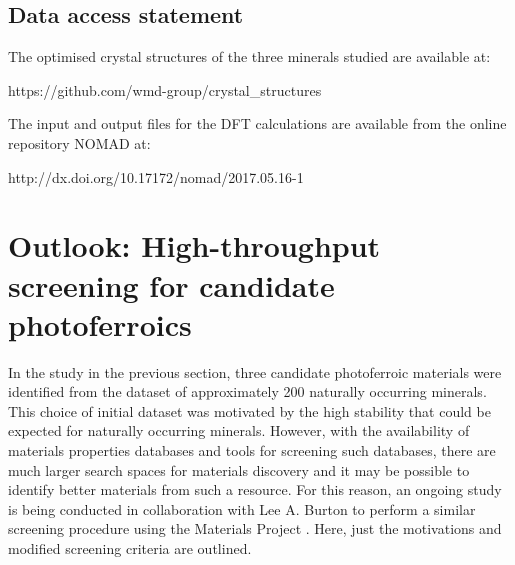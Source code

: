 \documentclass[11pt, twoside]{report}
\begin{document}
\subsection{Data access statement}
The optimised crystal structures of the three minerals studied are available at:

https://github.com/wmd-group/crystal\_structures

The input and output files for the DFT calculations are available from the online  repository NOMAD at: 

http://dx.doi.org/10.17172/nomad/2017.05.16-1



\section{Outlook: High-throughput screening for candidate photoferroics}



In the study in the previous section, three candidate photoferroic materials were identified from the dataset of approximately 200 naturally occurring minerals. This choice of initial dataset was motivated by the high stability that could be expected for naturally occurring minerals. However, with the availability of materials properties databases and tools for screening such databases, there are much larger search spaces for materials discovery and it may be possible to identify better materials from such a resource. For this reason, an ongoing study is being conducted in collaboration with Lee A. Burton to perform a similar screening procedure using the Materials Project \cite{materials_project}. Here, just the motivations and modified screening criteria are outlined.
\end{document}
